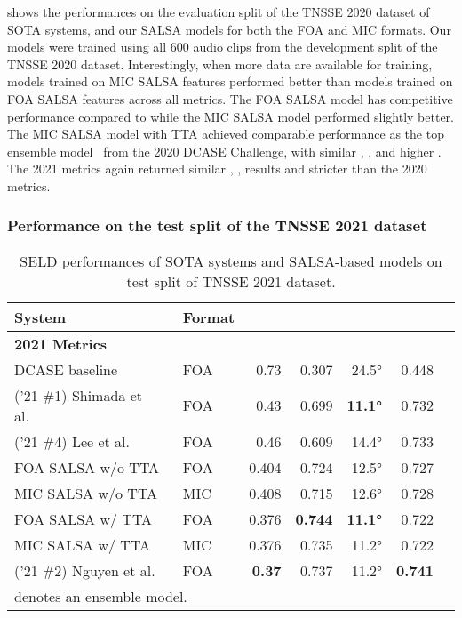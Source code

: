 \documentclass[journal]{IEEEtran}
\newcommand{\etalcite}[1]{ et al.~\cite{#1}}
\newcommand{\ER}{\xspace}
\newcommand{\Fone}{\xspace}
\newcommand{\LE}{\xspace}
\newcommand{\LR}{\xspace}
\begin{document}
 shows the performances on the evaluation split of the TNSSE 2020 dataset of SOTA systems, and our SALSA models for both the FOA and MIC formats. Our models were trained using all \num{600} audio clips from the development split of the TNSSE 2020 dataset. Interestingly, when more data are available for training, models trained on MIC SALSA features performed better than models trained on FOA SALSA features across all metrics. The FOA SALSA model has competitive performance compared to \cite{Cao2021AnDetection} while the MIC SALSA model performed slightly better. The MIC SALSA model with TTA achieved comparable performance as the top ensemble model~\cite{Wang2020TheChallenge} from the 2020 DCASE Challenge, with similar \ER, \LE, \LR and higher \Fone. The 2021 metrics again returned similar \ER, \Fone, \LE results and stricter \LR than the 2020 metrics.   

\subsubsection{Performance on the test split of the TNSSE 2021 dataset}

\begin{table}[t] \small
    \centering
    \caption{SELD performances of SOTA systems and SALSA-based models on test split of TNSSE 2021 dataset.}
    
    \setlength{\tabcolsep}{3pt}
    \footnotesize
    \noindent\begin{tabularx}{\columnwidth}{Xlrrrrr}
    \toprule 
        System
        & Format
        &  
        & 
        & 
        &  \\
    \midrule
    \bfseries 2021 Metrics \\
        DCASE baseline~\cite{Politis2021}
            & FOA & 0.73\hphantom{0} & 0.307 & 24.5\si{\degree} & 0.448 \\
        ('21 \#1) Shimada\etalcite{Shimada2021EnsembleDetection} 
            & FOA & 0.43\hphantom{0} & 0.699 & \bf{11.1\si{\degree}} & 0.732 \\
        ('21 \#4) Lee\etalcite{Lee2021SoundChallenge} 
            & FOA & 0.46\hphantom{0} & 0.609 & 14.4\si{\degree} & 0.733 \\
    \midrule
        FOA SALSA w/o TTA
            & FOA & 0.404 & 0.724 & 12.5\si{\degree} & 0.727 \\
        MIC SALSA w/o TTA
            & MIC & 0.408 & 0.715 & 12.6\si{\degree} & 0.728 \\ 
        FOA SALSA w/ TTA
            & FOA & 0.376 & \bf{0.744} & \bf{11.1\si{\degree}} & 0.722 \\
        MIC SALSA w/ TTA
            & MIC & 0.376 & 0.735 & 11.2\si{\degree} & 0.722 \\ 
        ('21 \#2) Nguyen\etalcite{Nguyen2021DCASEDetection} 
            & FOA & \bf{0.37\hphantom{0}} & 0.737 & 11.2\si{\degree} & \bf{0.741} \\
    \bottomrule
    \multicolumn{2}{l}{ denotes an ensemble model.}
    \end{tabularx}
    \label{tab:sota_2021_dev}
\end{table}
\end{document}

